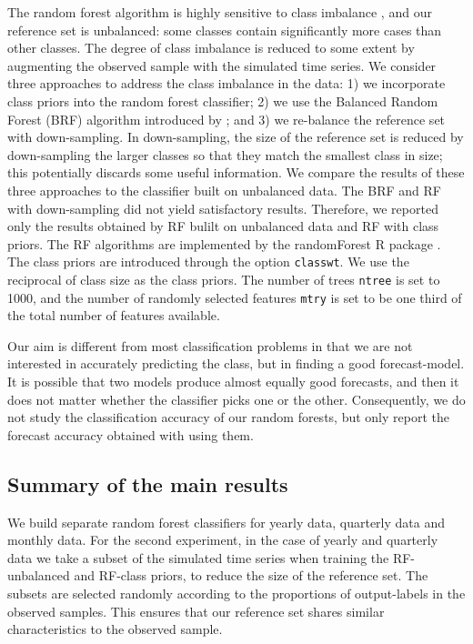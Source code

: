 \documentclass[11pt,a4paper,]{article}
\theoremstyle{definition}
\theoremstyle{definition}
\theoremstyle{definition}
\theoremstyle{remark}
\begin{document}
The random forest algorithm is highly sensitive to class imbalance
\autocite{breiman2001random}, and our reference set is unbalanced: some
classes contain significantly more cases than other classes. The degree
of class imbalance is reduced to some extent by augmenting the observed
sample with the simulated time series. We consider three approaches to
address the class imbalance in the data: 1) we incorporate class priors
into the random forest classifier; 2) we use the Balanced Random Forest
(BRF) algorithm introduced by \textcite{chen2004using}; and 3) we
re-balance the reference set with down-sampling. In down-sampling, the
size of the reference set is reduced by down-sampling the larger classes
so that they match the smallest class in size; this potentially discards
some useful information. We compare the results of these three
approaches to the classifier built on unbalanced data. The BRF and RF
with down-sampling did not yield satisfactory results. Therefore, we
reported only the results obtained by RF bulilt on unbalanced data and
RF with class priors. The RF algorithms are implemented by the
randomForest R package \autocites{liaw2002randomforest}{rfpkg}. The
class priors are introduced through the option \texttt{classwt}. We use
the reciprocal of class size as the class priors. The number of trees
\texttt{ntree} is set to 1000, and the number of randomly selected
features \texttt{mtry} is set to be one third of the total number of
features available.

Our aim is different from most classification problems in that we are
not interested in accurately predicting the class, but in finding a good
forecast-model. It is possible that two models produce almost equally
good forecasts, and then it does not matter whether the classifier picks
one or the other. Consequently, we do not study the classification
accuracy of our random forests, but only report the forecast accuracy
obtained with using them.

\subsection{Summary of the main results}\label{sec:results}

We build separate random forest classifiers for yearly data, quarterly
data and monthly data. For the second experiment, in the case of yearly
and quarterly data we take a subset of the simulated time series when
training the RF-unbalanced and RF-class priors, to reduce the size of
the reference set. The subsets are selected randomly according to the
proportions of output-labels in the observed samples. This ensures that
our reference set shares similar characteristics to the observed sample.
\end{document}
